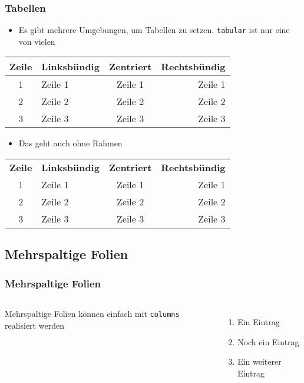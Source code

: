 \documentclass{beamer}
\begin{document}
\begin{frame}[fragile]
\frametitle{Tabellen}
\begin{itemize}
\item Es gibt mehrere Umgebungen, um Tabellen zu setzen. \texttt{tabular} ist nur eine von vielen
\end{itemize}

\begin{center}
\begin{tabular}{|c|l|c|r|}
\hline
  \textbf{Zeile} & \textbf{Linksbündig} & \textbf{Zentriert} & \textbf{Rechtsbündig} \\
\hline\hline
  1 & Zeile 1 & Zeile 1 & Zeile 1 \\
  2 & Zeile 2 & Zeile 2 & Zeile 2 \\
  3 & Zeile 3 & Zeile 3 & Zeile 3 \\
\hline
\end{tabular}
\end{center}

\begin{itemize}
\item Das geht auch ohne Rahmen
\end{itemize}

\begin{center}
\begin{tabular}{clcr}
  \textbf{Zeile} & \textbf{Linksbündig} & \textbf{Zentriert} & \textbf{Rechtsbündig} \\
  1 & Zeile 1 & Zeile 1 & Zeile 1 \\
  2 & Zeile 2 & Zeile 2 & Zeile 2 \\
  3 & Zeile 3 & Zeile 3 & Zeile 3 \\
\end{tabular}
\end{center}
\end{frame}

\subsection{Mehrspaltige Folien}

\begin{frame}
\frametitle{Mehrspaltige Folien}
\begin{columns}
                Mehrspaltige Folien können einfach mit \texttt{columns} realisiert werden
                \begin{enumerate}
                \item Ein Eintrag
                \item Noch ein Eintrag
                \item Ein weiterer Eintrag
                \end{enumerate}
\end{columns}
\end{frame}
\end{document}
